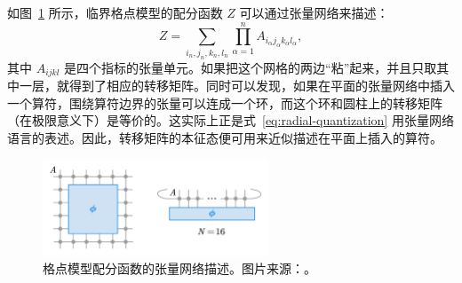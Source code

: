 
如图~\ref{fig:partition-function-tensor-network} 所示，临界格点模型的配分函数 $Z$ 可以通过张量网络来描述：
\begin{equation}
  Z = \sum_{i_n,j_n,k_n,l_n} \prod_{\alpha=1}^n A_{i_\alpha j_\alpha k_\alpha l_\alpha},
  \label{eq:partition-function-tensor-network}
\end{equation}
其中 $A_{ijkl}$ 是四个指标的张量单元。如果把这个网格的两边“粘”起来，并且只取其中一层，就得到了相应的转移矩阵。同时可以发现，如果在平面的张量网络中插入一个算符，围绕算符边界的张量可以连成一个环，而这个环和圆柱上的转移矩阵（在极限意义下）是等价的。这实际上正是式~\eqref{eq:radial-quantization} 用张量网络语言的表述。因此，转移矩阵的本征态便可用来近似描述在平面上插入的算符。

\begin{figure}[ht]
  \centering
  \includegraphics[width=0.6\textwidth]{images/virasoro/transfer-matrix.pdf}
  \caption[格点模型配分函数的张量网络描述]{格点模型配分函数的张量网络描述。图片来源：\parencite{wang2022virasoro}。}
  \label{fig:partition-function-tensor-network}
\end{figure}


